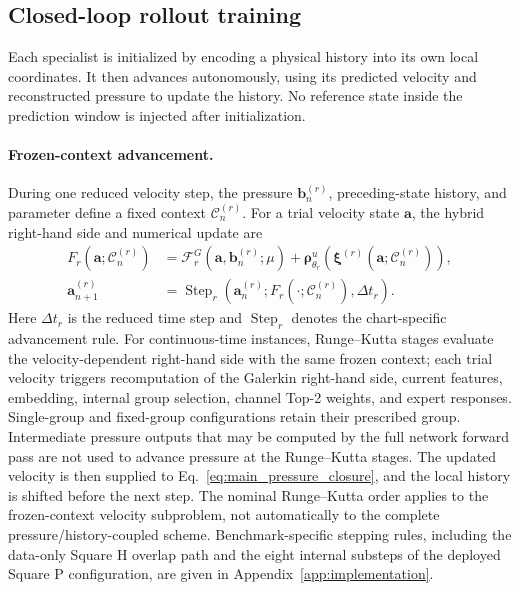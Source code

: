 \subsection{Closed-loop rollout training}
\label{sec:rollout_training}

Each specialist is initialized by encoding a physical history into
its own local coordinates. It then advances autonomously, using its
predicted velocity and reconstructed pressure to update the history.
No reference state inside the prediction window is injected after
initialization.

\paragraph{Frozen-context advancement.}
During one reduced velocity step, the pressure $\bm b_n^{(r)}$,
preceding-state history, and parameter define a fixed context
$\mathcal C_n^{(r)}$. For a trial velocity state $\bm a$, the hybrid
right-hand side and numerical update are
\begin{align}
  F_r(\bm a;\mathcal C_n^{(r)})
  &=\mathcal F_r^G(\bm a,\bm b_n^{(r)};\mu)
    +\bm\rho^u_{\theta_r}\!\left(
      \bm\xi^{(r)}(\bm a;\mathcal C_n^{(r)})\right),
    \label{eq:main_frozen_context_rhs}
    \\
  \bm a_{n+1}^{(r)}
  &=\operatorname{Step}_r\!\left(
     \bm a_n^{(r)};
     F_r(\cdot;\mathcal C_n^{(r)}),\Delta t_r\right).
    \label{eq:main_specialist_step}
\end{align}
Here $\Delta t_r$ is the reduced time step and
$\operatorname{Step}_r$ denotes the chart-specific advancement rule.
For continuous-time instances, Runge--Kutta stages evaluate the
velocity-dependent right-hand side with the same frozen context;
each trial velocity triggers recomputation of the Galerkin right-hand
side, current features, embedding, internal group selection, channel
Top-2 weights, and expert responses. Single-group and fixed-group
configurations retain their prescribed group. Intermediate pressure
outputs that may be computed by the full network forward pass are
not used to advance pressure at the Runge--Kutta stages. The updated velocity is then supplied to
Eq.~\eqref{eq:main_pressure_closure}, and the local history is shifted
before the next step. The nominal Runge--Kutta order applies to the
frozen-context velocity subproblem, not automatically to the complete
pressure/history-coupled scheme. Benchmark-specific stepping rules,
including the data-only Square H overlap path and the eight internal
substeps of the deployed Square P configuration, are given in
Appendix~\ref{app:implementation}.

